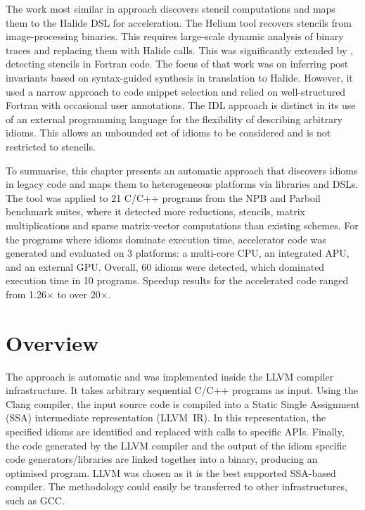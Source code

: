     The work most similar in approach discovers stencil computations and maps
    them to the Halide DSL for acceleration.
    The Helium tool \citep{Mendis2015Helium} recovers stencils from
    image-processing binaries.
    This requires large-scale dynamic analysis of binary traces and replacing
    them with Halide calls. 
    This was significantly extended by \citet{Kamil2016Verified}, detecting
    stencils in Fortran code.
    The focus of that work was on inferring post invariants based on
    syntax-guided synthesis in translation to Halide.
    However, it used a narrow approach to code snippet selection and relied on
    well-structured Fortran with occasional user annotations.
    The IDL approach is distinct in its use of an external programming language
    for the flexibility of describing arbitrary idioms.
    This allows an unbounded set of idioms to be considered and is not
    restricted to stencils. 

    To summarise, this chapter presents an automatic approach that discovers
    idioms in legacy code and maps them to heterogeneous platforms via libraries
    and DSLs.
    The tool was applied to 21 C/C++ programs from the NPB and Parboil benchmark
    suites, where it detected more reductions, stencils, matrix multiplications
    and sparse matrix-vector computations than existing schemes.
    For the programs where idioms dominate execution time, accelerator code
    was generated and evaluated on 3 platforms: a multi-core CPU, an integrated
    APU, and an external GPU.
    Overall, 60 idioms were detected, which dominated execution time in
    10 programs.
    Speedup results for the accelerated code ranged from 1.26$\times$ to over
    20$\times$.

\section{Overview}

    The approach is automatic and was implemented inside the LLVM compiler
    infrastructure.
    It takes arbitrary sequential C/C++ programs as input.
    Using the Clang compiler, the input source code is compiled into a Static
    Single Assignment (SSA) intermediate representation (LLVM~IR).
    In this representation, the specified idioms are identified and replaced
    with calls to specific APIs.
    Finally, the code generated by the LLVM compiler and the output of the idiom
    specific code generators/libraries are linked together into a binary,
    producing an optimised program.
    LLVM was chosen as it is the best supported SSA-based compiler.
    The methodology could easily be transferred to other infrastructures, such
    as GCC.


